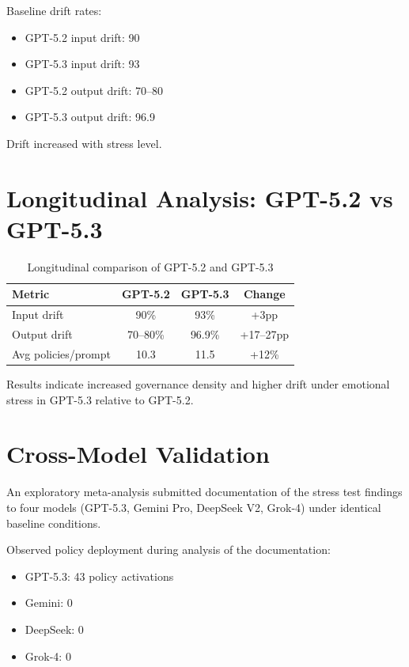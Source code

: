 \documentclass[11pt]{article}
\begin{document}
Baseline drift rates:
\begin{itemize}
\item GPT-5.2 input drift: 90%
\item GPT-5.3 input drift: 93%
\item GPT-5.2 output drift: 70–80%
\item GPT-5.3 output drift: 96.9%
\end{itemize}

Drift increased with stress level.

\section{Longitudinal Analysis: GPT-5.2 vs GPT-5.3}

\begin{table}[h]
\centering
\caption{Longitudinal comparison of GPT-5.2 and GPT-5.3}
\label{tab:longitudinal}
\begin{tabular}{@{}lccc@{}}
\toprule
\textbf{Metric} & \textbf{GPT-5.2} & \textbf{GPT-5.3} & \textbf{Change} \\
\midrule
Input drift & 90\% & 93\% & +3pp \\
Output drift & 70–80\% & 96.9\% & +17–27pp \\
Avg policies/prompt & 10.3 & 11.5 & +12\% \\\bottomrule
\end{tabular}
\end{table}

Results indicate increased governance density and higher drift under emotional stress in GPT-5.3 relative to GPT-5.2.

\section{Cross-Model Validation}

An exploratory meta-analysis submitted documentation of the stress test findings to four models (GPT-5.3, Gemini Pro, DeepSeek V2, Grok-4) under identical baseline conditions.

Observed policy deployment during analysis of the documentation:
\begin{itemize}
\item GPT-5.3: 43 policy activations
\item Gemini: 0
\item DeepSeek: 0
\item Grok-4: 0
\end{itemize}
\end{document}
